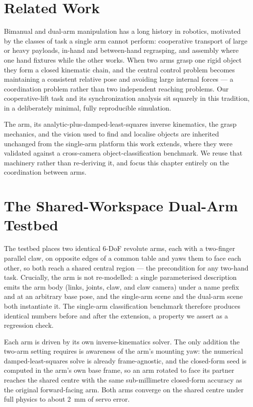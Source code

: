 \documentclass[runningheads]{llncs}
\begin{document}
\section{Related Work}
Bimanual and dual-arm manipulation has a long history in robotics, motivated by the classes of task a single arm cannot perform: cooperative transport of large or heavy payloads, in-hand and between-hand regrasping, and assembly where one hand fixtures while the other works. When two arms grasp one rigid object they form a closed kinematic chain, and the central control problem becomes maintaining a consistent relative pose and avoiding large internal forces --- a coordination problem rather than two independent reaching problems. Our cooperative-lift task and its synchronization analysis sit squarely in this tradition, in a deliberately minimal, fully reproducible simulation.

The arm, its analytic-plus-damped-least-squares inverse kinematics, the grasp mechanics, and the vision used to find and localise objects are inherited unchanged from the single-arm platform this work extends, where they were validated against a cross-camera object-classification benchmark. We reuse that machinery rather than re-deriving it, and focus this chapter entirely on the coordination between arms.

\section{The Shared-Workspace Dual-Arm Testbed}
The testbed places two identical 6-DoF revolute arms, each with a two-finger parallel claw, on opposite edges of a common table and yaws them to face each other, so both reach a shared central region --- the precondition for any two-hand task. Crucially, the arm is not re-modelled: a single parameterised description emits the arm body (links, joints, claw, and claw camera) under a name prefix and at an arbitrary base pose, and the single-arm scene and the dual-arm scene both instantiate it. The single-arm classification benchmark therefore produces identical numbers before and after the extension, a property we assert as a regression check.

Each arm is driven by its own inverse-kinematics solver. The only addition the two-arm setting requires is awareness of the arm's mounting yaw: the numerical damped-least-squares solve is already frame-agnostic, and the closed-form seed is computed in the arm's own base frame, so an arm rotated to face its partner reaches the shared centre with the same sub-millimetre closed-form accuracy as the original forward-facing arm. Both arms converge on the shared centre under full physics to about 2~mm of servo error.
\end{document}
